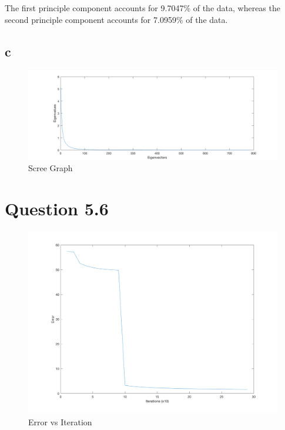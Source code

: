 The first principle component accounts for 9.7047\% of the data, whereas the second principle component accounts for 7.0959\% of the data.

\subsection*{c}

\begin{figure}[H]
    \includegraphics[width=\linewidth]{../../pracs/week6/images/scree_graph}
    \centering
    \caption{Scree Graph}
\end{figure}

\section*{Question 5.6}

\begin{figure}[H]
    \includegraphics[width=\linewidth]{../../pracs/week6/images/q6_error}
    \centering
    \caption{Error vs Iteration\label{fig:q6}}
\end{figure}

